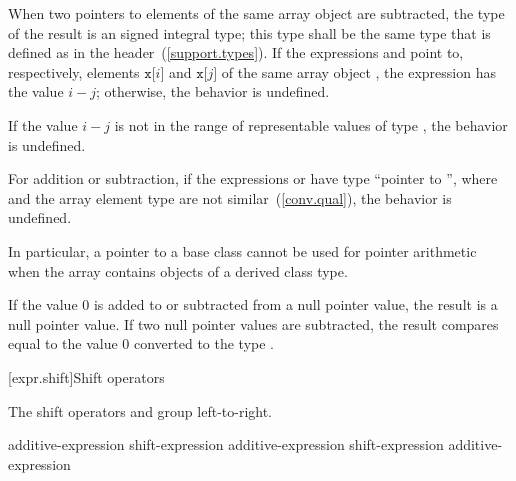 \pnum
{}%
%
%
%
%
When two pointers to elements of the same array object are subtracted,
the type of the result is an  signed
integral type; this type shall be the same type that is defined as
 in the 
header~(\ref{support.types}).
If the expressions  and 
point to, respectively,
elements
$\mathtt{x[}i\mathtt{]}$
and
$\mathtt{x[}j\mathtt{]}$
of the same array object ,
the expression  has the value $i - j$;
otherwise, the behavior is undefined.
\begin{note}
If the value $i - j$
is not in the range of representable values
of type ,
the behavior is undefined.
\end{note}

\pnum
For addition or subtraction, if the expressions  or  have
type ``pointer to \cv{} '', where  and the array element type
are not similar~(\ref{conv.qual}), the behavior is undefined.
\begin{note} In particular, a pointer to a base class cannot be used for
pointer arithmetic when the array contains objects of a derived class type.
\end{note}

\pnum
If the value 0 is added to or subtracted from a null pointer value,
the result is a null pointer value.
If two null pointer values are subtracted,
the result compares equal to the value 0
converted to the type .

[expr.shift]{Shift operators}

\pnum
{}%
%
%
%
%
The shift operators \tcode{\shl} and \tcode{\shr} group left-to-right.

%
%
%
%
%
\begin{bnf}
\br
    additive-expression\br
    shift-expression \terminal{\shl} additive-expression\br
    shift-expression \terminal{\shr} additive-expression
\end{bnf}

